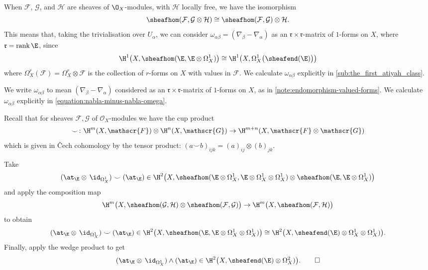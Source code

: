         \begin{note}\label{note:endomorphism-valued-forms}
            When $\mathcal{F}$, $\mathcal{G}$, and $\mathcal{H}$ are sheaves of $\O_X$-modules, with $\mathcal{H}$ locally free, we have the isomorphism
            \[
                \sheafhom(\mathcal{F},\mathcal{G}\otimes\mathcal{H}) \cong \sheafhom(\mathcal{F},\mathcal{G})\otimes\mathcal{H}.
            \]
            This means that, taking the trivialisation over $U_\alpha$, we can consider $\omega_{\alpha\beta}=(\nabla_\beta-\nabla_\alpha)$ as an $\mathfrak{r}\times \mathfrak{r}$-matrix of $1$-forms on $X$, where $\mathfrak{r}=\operatorname{rank}\E$, since
            \[
                \H^1\big(X,\sheafhom(\E,\E\otimes\Omega_X^1)\big) \cong \H^1\big(X,\Omega_X^1\big(\sheafend(\E)\big)\big)
            \]
            where $\Omega_X^r(\mathcal{F})=\Omega_X^r\otimes\mathcal{F}$ is the collection of $r$-forms on $X$ with values in $\mathcal{F}$.
            We calculate $\omega_{\alpha\beta}$ explicitly in \cref{sub:the_first_atiyah_class}.
        \end{note}

        \begin{definition}
            We write $\omega_{\alpha\beta}$ to mean $(\nabla_\beta-\nabla_\alpha)$ considered as an $\mathfrak{r}\times \mathfrak{r}$-matrix of $1$-forms on $X$, as in \cref{note:endomorphism-valued-forms}.
            We calculate $\omega_{\alpha\beta}$ explicitly in \cref{equation:nabla-minus-nabla-omega}.
        \end{definition}

        Recall that for sheaves $\mathscr{F},\mathscr{G}$ of $\mathcal{O}_X$-modules we have the cup product
        \[
            \smile \colon \H^m(X,\mathscr{F})\otimes\H^n(X,\mathscr{G}) \to \H^{m+n}(X,\mathscr{F}\otimes\mathscr{G})
        \]
        which is given in Čech cohomology by the tensor product: $(a\smile b)_{ijk} = (a)_{ij}\otimes(b)_{jk}$.

        \begin{example}\label{example:second-atiyah-class-formal}
            Take
            \[
                (\at_\E\otimes\,\id_{\Omega_X^1})\smile(\at_\E) \in \H^2\big(X,\sheafhom(\E\otimes\Omega_X^1,\E\otimes\Omega_X^1\otimes\Omega_X^1)\otimes\sheafhom(\E,\E\otimes\Omega_X^1)\big)
            \]
            and apply the composition map
            \[
                \H^m\big(X,\sheafhom(\mathcal{G},\mathcal{H})\otimes\sheafhom(\mathcal{F},\mathcal{G})\big) \to \H^m\big(X,\sheafhom(\mathcal{F},\mathcal{H})\big)
            \]
            to obtain
            \[
                (\at_\E\otimes\,\id_{\Omega_X^1})\smile(\at_\E) \in \H^2\big(X,\sheafhom(\E,\E\otimes\Omega_X^1\otimes\Omega_X^1)\big) \cong \H^2\big(X,\sheafend(\E)\otimes\Omega_X^1\otimes\Omega_X^1)\big).
            \]
            Finally, apply the wedge product to get
            \[
                (\at_\E\otimes\,\id_{\Omega_X^1})\wedge(\at_\E) \in \H^2\big(X,\sheafend(\E)\otimes\Omega_X^2)\big).\qedhere
            \]
        \end{example}

